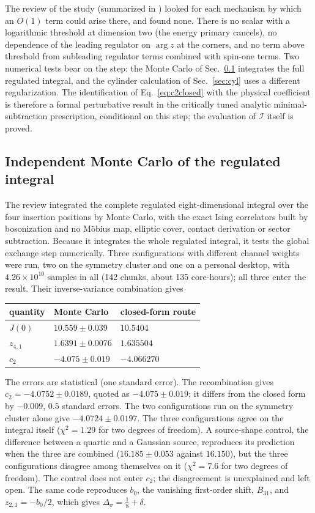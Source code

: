 \documentclass[11pt,a4paper]{article}
\numberwithin{equation}{section}
\newcommand{\Ds}{\Delta_\sigma}
\newcommand{\cI}{\mathcal I}
\newcommand{\file}[1]{\path{#1}}
\newcommand{\sci}[2]{#1\times10^{#2}}
\begin{document}
The review of the study (summarized in \file{docs/c2_closed_d2/REVIEWS.md}) looked for each mechanism by which an
$O(1)$ term could arise there, and found none. There is no scalar with a logarithmic threshold at dimension two (the energy
primary cancels), no dependence of the leading regulator on $\arg z$ at the corners, and no term above threshold from
subleading regulator terms combined with spin-one terms. Two numerical tests bear on the step: the Monte Carlo of
Sec.~\ref{sec:mc} integrates the full regulated integral, and the cylinder calculation of Sec.~\ref{sec:cyl} uses a
different regularization. The identification of Eq.~\eqref{eq:c2closed} with the physical coefficient is therefore a
formal perturbative result in the critically tuned analytic minimal-subtraction prescription, conditional on this
step; the evaluation of $\cI$ itself is proved.

\subsection{Independent Monte Carlo of the regulated integral}\label{sec:mc}
The review integrated the complete regulated eight-dimensional integral over the four insertion positions by Monte
Carlo, with the exact Ising correlators built by bosonization and no M\"obius map, elliptic cover, contact derivation
or sector subtraction. Because it integrates the whole regulated integral, it tests the global exchange step
numerically. Three configurations with different channel weights were run, two on the symmetry cluster and one on a
personal desktop, with $\sci{4.26}{10}$ samples in all (142 chunks, about 135 core-hours); all three enter the
result. Their inverse-variance combination gives
\begin{center}\small
\begin{tabular}{@{}lll@{}}
\toprule
quantity & Monte Carlo & closed-form route\\
\midrule
$J(0)$ & $10.559\pm0.039$ & $10.5404$\\
$z_{4,1}$ & $1.6391\pm0.0076$ & $1.635504$\\
$c_2$ & $-4.075\pm0.019$ & $-4.066270$\\
\bottomrule
\end{tabular}
\end{center}
The errors are statistical (one standard error). The recombination gives $c_2=-4.0752\pm0.0189$, quoted as
$-4.075\pm0.019$; it differs from the closed form by $-0.009$, $0.5$ standard errors. The two configurations run on
the symmetry cluster alone give $-4.0724\pm0.0197$. The three configurations agree on the integral itself ($\chi^2=1.29$
for two degrees of freedom). A source-shape control, the difference between a quartic and a Gaussian source,
reproduces its prediction when the three are combined ($16.185\pm0.053$ against $16.150$), but the three
configurations disagree among themselves on it ($\chi^2=7.6$ for two degrees of freedom). The control does not enter
$c_2$; the disagreement is unexplained and left open. The same code reproduces $b_0$, the vanishing first-order shift,
$B_{31}$, and $z_{2,1}=-b_0/2$, which gives $\Ds=\frac18+\delta$.
\end{document}
